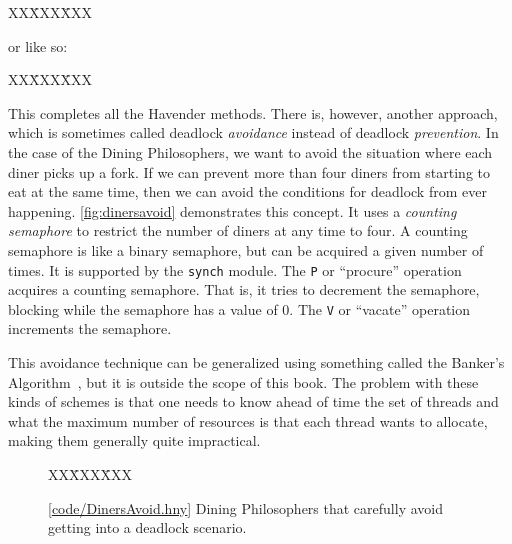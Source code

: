 \documentclass{report}
\newcommand{\harmonysource}[1]{
\begin{tabbing}
XX\=XXX\=XXX\kill
    
\end{tabbing}
}
\newcommand{\harmonylink}[1]{%
[\href{https://harmony.cs.cornell.edu/#1}{\underline{#1}}]%
}
\newenvironment{code}{
\tcolorbox
}{
\endtcolorbox
}
\begin{document}
\vspace{1em}
\begin{code}
\harmonysource{dinersfix}
\end{code}
\vspace{1em}

or like so:

\vspace{1em}
\begin{code}
\harmonysource{dinersfix2}
\end{code}
\vspace{1em}

This completes all the Havender methods.
There is, however, another approach, which is sometimes called deadlock
\emph{avoidance}
%
instead of deadlock \emph{prevention}.
In the case of the Dining Philosophers, we want to avoid the situation where each
diner picks up a fork.  If we can prevent more than four diners from starting to
eat at the same time, then we can avoid the conditions for deadlock from ever
happening.
\autoref{fig:dinersavoid} demonstrates this concept.  It uses a
\emph{counting semaphore} to restrict the number of diners at any time to
four.  A counting semaphore is like a binary semaphore, but can be
acquired a given number of times.  It is supported by the \texttt{synch}
module.  The \texttt{P} or ``procure'' operation acquires a counting
semaphore.  That is, it tries to decrement the semaphore, blocking while
the semaphore has a value of 0.  The \texttt{V} or ``vacate'' operation
increments the semaphore.

This avoidance technique can be generalized using something called the
Banker's Algorithm~\cite{EWD108}, but it is outside the scope of this book.
The problem with these kinds of schemes is that one needs to know ahead of time
the set of threads and what the maximum number of resources is that each thread
wants to allocate, making them generally quite impractical.

\begin{figure}
\begin{code}
\harmonysource{DinersAvoid}
\end{code}
\caption{\harmonylink{code/DinersAvoid.hny} Dining Philosophers that carefully avoid getting into a deadlock
scenario.}
\label{fig:dinersavoid}
\end{figure}
\end{document}
